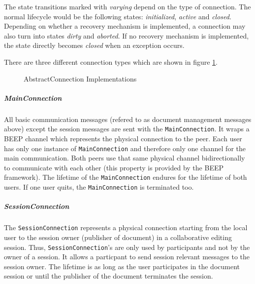 The state transitions marked with \emph{varying} depend on the type of connection. The normal lifecycle would be the following states: \emph{initialized}, \emph{active} and \emph{closed}. Depending on whether a recovery mechanism is implemented, a connection may also turn into states \emph{dirty} and \emph{aborted}. If no recovery mechanism is implemented, the state directly becomes \emph{closed} when an exception occurs.

There are three different connection types which are shown in figure \ref{fig:network.protocol.connection.uml}.

\begin{figure}[H]
 \centering
 \caption{AbstractConnection Implementations}
 \label{fig:network.protocol.connection.uml}
\end{figure}


\subparagraph{MainConnection}
All basic communication messages (refered to as document management messages above) except the session messages are sent with the \texttt{MainConnection}. It wraps a BEEP channel which represents the physical connection to the peer. Each user has only one instance of \texttt{MainConnection} and therefore only one channel for the main communication. Both peers use that same physical channel bidirectionally to communicate with each other (this property is provided by the BEEP framework). The lifetime of the \texttt{MainConnection} endures for the lifetime of both users. If one user quits, the \texttt{MainConnection} is terminated too.

\subparagraph{SessionConnection}
The \texttt{SessionConnection} represents a physical connection starting from the local user to the session owner (publisher of document) in a collaborative editing session. Thus, \texttt{SessionConnection}'s are only used by participants and not by the owner of a session. It allows a particpant to send session relevant messages to the session owner. The lifetime is as long as the user participates in the document session or until the publisher of the document terminates the session.

